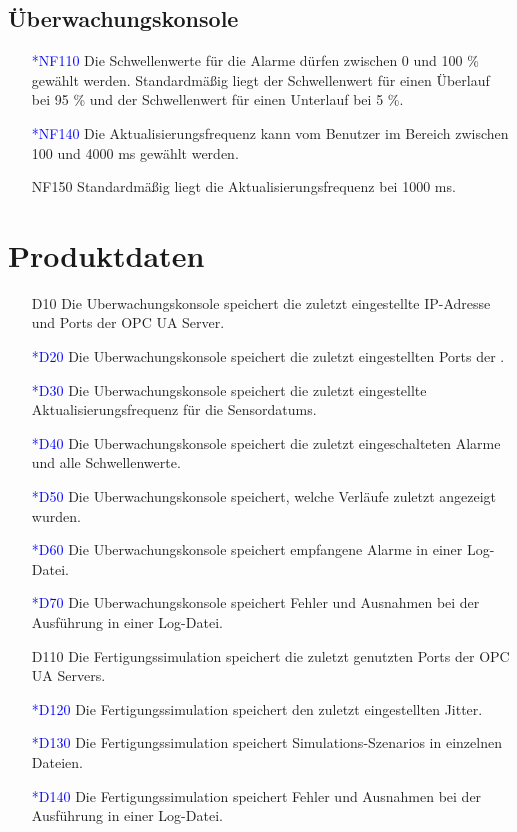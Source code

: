 \documentclass[parskip=full]{scrartcl}
\begin{document}
\subsection{Überwachungskonsole}
\begin{enumerate}
  \item[\textcolor{blue}{*NF110}] Die Schwellenwerte für die Alarme dürfen zwischen 0 und 100 \% gewählt werden. Standardmäßig liegt der Schwellenwert für einen Überlauf bei
  95 \% und der Schwellenwert für einen Unterlauf bei 5 \%.
  \item[\textcolor{blue}{*NF140}] Die Aktualisierungsfrequenz kann vom Benutzer im Bereich zwischen 100 und 4000 ms gewählt werden.
  \item[NF150] Standardmäßig liegt die Aktualisierungsfrequenz bei 1000 ms.
\end{enumerate}

\pagebreak
\section{Produktdaten}
\begin{enumerate}
  \item[D10] Die \gls{Uberwachungskonsole} speichert die zuletzt eingestellte IP-Adresse und Ports der \gls{OPC UA Server}.
  \item[\textcolor{blue}{*D20}] Die \gls{Uberwachungskonsole} speichert die zuletzt eingestellten Ports der .
  \item[\textcolor{blue}{*D30}] Die \gls{Uberwachungskonsole} speichert die zuletzt eingestellte Aktualisierungsfrequenz für die \glspl{Sensordatum}.
  \item[\textcolor{blue}{*D40}] Die \gls{Uberwachungskonsole} speichert die zuletzt eingeschalteten Alarme und alle Schwellenwerte.
  \item[\textcolor{blue}{*D50}] Die \gls{Uberwachungskonsole} speichert, welche Verläufe zuletzt angezeigt wurden.
  \item[\textcolor{blue}{*D60}] Die \gls{Uberwachungskonsole} speichert empfangene Alarme in einer Log-Datei.
  \item[\textcolor{blue}{*D70}] Die \gls{Uberwachungskonsole} speichert Fehler und Ausnahmen bei der Ausführung in einer Log-Datei.
  \item[D110] Die \gls{Fertigungssimulation} speichert die zuletzt genutzten Ports der \glspl{OPC UA Server}.
  \item[\textcolor{blue}{*D120}] Die \gls{Fertigungssimulation} speichert den zuletzt eingestellten \gls{Jitter}.
  \item[\textcolor{blue}{*D130}] Die \gls{Fertigungssimulation} speichert \glspl{Simulations-Szenario} in einzelnen Dateien.
  \item[\textcolor{blue}{*D140}] Die \gls{Fertigungssimulation} speichert Fehler und Ausnahmen bei der Ausführung in einer Log-Datei.
\end{enumerate}
\end{document}
